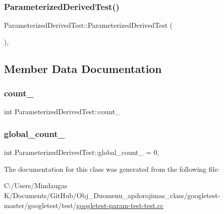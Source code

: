 \mbox{\label{class_parameterized_derived_test_a5fb176948a078a3754df7b9939568c78}} 
\subsubsection{\texorpdfstring{ParameterizedDerivedTest()}{ParameterizedDerivedTest()}\hspace{0.1cm}{\footnotesize\ttfamily [3/3]}}
{\footnotesize\ttfamily Parameterized\+Derived\+Test\+::\+Parameterized\+Derived\+Test (\begin{DoxyParamCaption}{ }\end{DoxyParamCaption})\hspace{0.3cm}{\ttfamily [inline]}, {\ttfamily [protected]}}



\subsection{Member Data Documentation}
\mbox{\label{class_parameterized_derived_test_ad8a2968265e7477c13585d17bbd0492c}} 
\subsubsection{\texorpdfstring{count\_}{count\_}}
{\footnotesize\ttfamily int Parameterized\+Derived\+Test\+::count\+\_\+\hspace{0.3cm}{\ttfamily [protected]}}

\mbox{\label{class_parameterized_derived_test_ab6c067a099764a9d58b5f2e8ebcb5d0f}} 
\subsubsection{\texorpdfstring{global\_count\_}{global\_count\_}}
{\footnotesize\ttfamily int Parameterized\+Derived\+Test\+::global\+\_\+count\+\_\+ = 0\hspace{0.3cm}{\ttfamily [static]}, {\ttfamily [protected]}}



The documentation for this class was generated from the following file\+:\begin{DoxyCompactItemize}
\item 
C\+:/\+Users/\+Mindaugas K/\+Documents/\+Git\+Hub/\+Obj\+\_\+\+Duomenu\+\_\+apdorojimas\+\_\+class/googletest-\/master/googletest/test/\mbox{\hyperlink{googletest-master_2googletest_2test_2googletest-param-test-test_8cc}{googletest-\/param-\/test-\/test.\+cc}}\end{DoxyCompactItemize}
